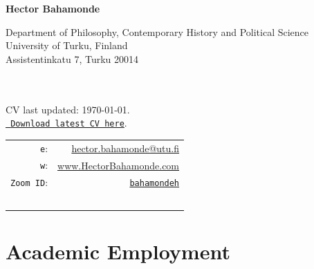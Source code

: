\documentclass[letterpaper]{article}
\def\name{Hector Bahamonde}
\begin{document}
\centerline{\huge \bf \name}

\vspace{0.25in}

\begin{minipage}{0.45\linewidth}
 Department of Philosophy, Contemporary History and Political Science\\
 University of Turku, Finland\\
 Assistentinkatu 7, Turku 20014\\
  \\
  \\
\begin{footnotesize}
CV last updated: \today. \\
\href{http://github.com/hbahamonde/Job_Market/raw/master/Bahamonde_CV.pdf}{\texttt{{\color{red} Download latest CV here}}}.%
\end{footnotesize}

\end{minipage}
 \hspace{\fill}\begin{minipage}{0.35\linewidth}
  \begin{tabular}{rr}
    \texttt{e}: & \href{mailto:hector.bahamonde@utu.fi}{hector.bahamonde@utu.fi} \\
    \texttt{w}: & \href{http://www.hectorbahamonde.com}{www.HectorBahamonde.com}\\
    \texttt{Zoom ID}: & \href{https://utu.zoom.us/my/bahamondeh}{\texttt{bahamondeh}}\\
    \\
    \\
    \\
    \\
    \\
  \end{tabular}
\end{minipage}


{\unskip}


\section*{Academic Employment}
\end{document}

